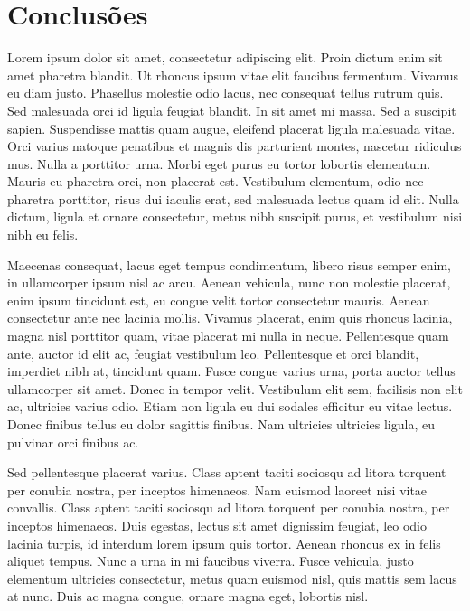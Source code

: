\section{Conclusões}

Lorem ipsum dolor sit amet, consectetur adipiscing elit. Proin dictum enim sit amet pharetra blandit. Ut rhoncus ipsum vitae elit faucibus fermentum. Vivamus eu diam justo. Phasellus molestie odio lacus, nec consequat tellus rutrum quis. Sed malesuada orci id ligula feugiat blandit. In sit amet mi massa. Sed a suscipit sapien. Suspendisse mattis quam augue, eleifend placerat ligula malesuada vitae. Orci varius natoque penatibus et magnis dis parturient montes, nascetur ridiculus mus. Nulla a porttitor urna. Morbi eget purus eu tortor lobortis elementum. Mauris eu pharetra orci, non placerat est. Vestibulum elementum, odio nec pharetra porttitor, risus dui iaculis erat, sed malesuada lectus quam id elit. Nulla dictum, ligula et ornare consectetur, metus nibh suscipit purus, et vestibulum nisi nibh eu felis.

Maecenas consequat, lacus eget tempus condimentum, libero risus semper enim, in ullamcorper ipsum nisl ac arcu. Aenean vehicula, nunc non molestie placerat, enim ipsum tincidunt est, eu congue velit tortor consectetur mauris. Aenean consectetur ante nec lacinia mollis. Vivamus placerat, enim quis rhoncus lacinia, magna nisl porttitor quam, vitae placerat mi nulla in neque. Pellentesque quam ante, auctor id elit ac, feugiat vestibulum leo. Pellentesque et orci blandit, imperdiet nibh at, tincidunt quam. Fusce congue varius urna, porta auctor tellus ullamcorper sit amet. Donec in tempor velit. Vestibulum elit sem, facilisis non elit ac, ultricies varius odio. Etiam non ligula eu dui sodales efficitur eu vitae lectus. Donec finibus tellus eu dolor sagittis finibus. Nam ultricies ultricies ligula, eu pulvinar orci finibus ac.

Sed pellentesque placerat varius. Class aptent taciti sociosqu ad litora torquent per conubia nostra, per inceptos himenaeos. Nam euismod laoreet nisi vitae convallis. Class aptent taciti sociosqu ad litora torquent per conubia nostra, per inceptos himenaeos. Duis egestas, lectus sit amet dignissim feugiat, leo odio lacinia turpis, id interdum lorem ipsum quis tortor. Aenean rhoncus ex in felis aliquet tempus. Nunc a urna in mi faucibus viverra. Fusce vehicula, justo elementum ultricies consectetur, metus quam euismod nisl, quis mattis sem lacus at nunc. Duis ac magna congue, ornare magna eget, lobortis nisl.

